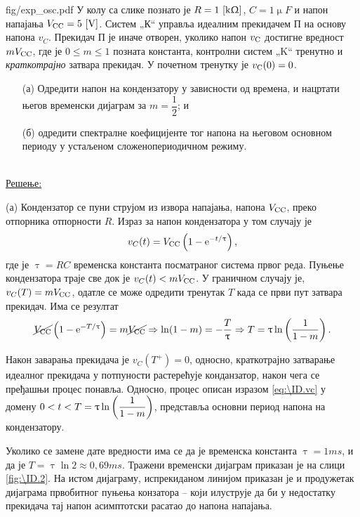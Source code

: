\begin{slikaDesno}{fig/exp_osc.pdf}
\PID У колу са слике познато је 
$R = 1\,\left[\mathrm{k\Upomega}\right]$, $C=1\unit{\upmu F}$ и 
напон напајања $V_{\rm CC} = 5\,\left[\mathrm{V}\right]$.
Систем „К“ управља идеалним прекидачем П 
на основу напона $v_{C}$. Прекидач П је иначе 
отворен, уколико напон $v_{\rm C}$ достигне вредност 
$mV_{\rm CC}$, где је $0 \leq m \leq 1$ позната 
константа, контролни систем „K“ тренутно и 
\textit{краткотрајно} затвара прекидач. У почетном 
тренутку је $v_{\rm C}(0) = 0$. 
\begin{enumerate}
\item[(а)] Одредити  напон 
на кондензатору у зависности од времена, и нацртати његов временски 
дијаграм за $m = \dfrac{1}{2}$; и
\item[(б)] одредити спектралне коефицијенте 
тог напона на његовом основном периоду у устаљеном 
сложенопериодичном режиму. 
\end{enumerate}
\end{slikaDesno} \\


\underline{\sc Решење:} 

(а) Кондензатор се пуни струјом из извора напајања, напона $V_{\rm CC}$,  
преко отпорника отпорности $R$. Израз за напон кондензатора у том случају је 
\begin{equation}
v_{C}(t) = V_{\rm CC} \left(
    1 - \ee^{-t/\uptau} 
\right), \label{eq:\ID.vc}
\end{equation} где је $\uptau = RC$ временска константа посматраног система првог реда. Пуњење кондензатора траје
све док је $v_C(t) < m V_{\rm CC}$. У граничном случају је, 
$v_C(T) = m V_{\rm CC}$, одатле се може одредити тренутак $T$ када се први пут затвара прекидач. 
Има се резултат
\begin{equation}
    \cancel {V_{\rm CC}} \left(
    1 - {\rm e}^{-T/\uptau} \right) = m \cancel{V_{\rm CC}}
    \Rightarrow \ln(1 - m) = -\dfrac{T}{\uptau} \Rightarrow 
    T = \uptau \ln \left( \dfrac{1}{1 - m} \right).
\end{equation}

Након заварања прекидача је $v_{C}(T^+) = 0$, односно, краткотрајно затварање идеалног прекидача 
у потпуности растерећује конданзатор, након чега се пређашњи процес понавља. 
Односно, процес описан изразом \eqref{eq:\ID.vc} у домену 
$\displaystyle 0 < t < T = \uptau \ln \left( \dfrac{1}{1 - m} \right)$, представља основни период напона
на кондензатору. 

Уколико се замене дате вредности има се да је временска константа 
$\uptau = 1\unit{ms}$, и да је $T = \uptau \ln 2 \approx 0,69 \unit{ms}$. 
Тражени временски дијаграм приказан је на слици \ref{fig:\ID.2}. На истом дијаграму, испрекиданом
линијом приказан је и продужетак дијаграма првобитног пуњења конзатора -- који илуструје да би 
у недостатку прекидача тај напон асимптотски расатао до напона напајања. 

